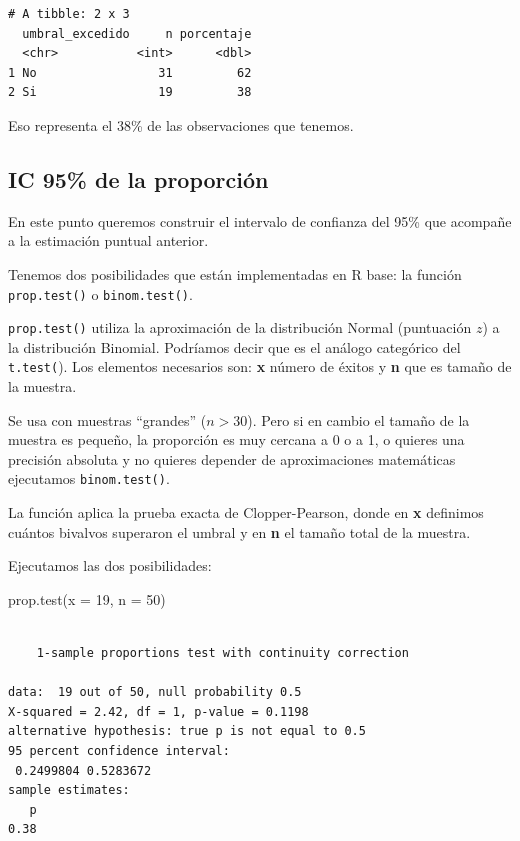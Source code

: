 \documentclass[
  spanish,
  a4paper,
]{scrbook}
\newenvironment{Shaded}{\begin{snugshade}}{\end{snugshade}}
\newcommand{\AttributeTok}[1]{\textcolor[rgb]{0.40,0.45,0.13}{#1}}
\newcommand{\DecValTok}[1]{\textcolor[rgb]{0.68,0.00,0.00}{#1}}
\newcommand{\FunctionTok}[1]{\textcolor[rgb]{0.28,0.35,0.67}{#1}}
\newcommand{\NormalTok}[1]{\textcolor[rgb]{0.00,0.23,0.31}{#1}}
\begin{document}
\begin{verbatim}
# A tibble: 2 x 3
  umbral_excedido     n porcentaje
  <chr>           <int>      <dbl>
1 No                 31         62
2 Si                 19         38
\end{verbatim}

Eso representa el 38\% de las observaciones que tenemos.

\subsection{IC 95\% de la proporción}\label{ic-95-de-la-proporciuxf3n}

En este punto queremos construir el intervalo de confianza del 95\% que
acompañe a la estimación puntual anterior.

Tenemos dos posibilidades que están implementadas en R base: la función
\texttt{prop.test()} o \texttt{binom.test()}.

\texttt{prop.test()} utiliza la aproximación de la distribución Normal
(puntuación \(z\)) a la distribución Binomial. Podríamos decir que es el
análogo categórico del \texttt{t.test(}). Los elementos necesarios son:
\textbf{x} número de éxitos y \textbf{n} que es tamaño de la muestra.

Se usa con muestras ``grandes'' (\(n > 30\)). Pero si en cambio el
tamaño de la muestra es pequeño, la proporción es muy cercana a 0 o a 1,
o quieres una precisión absoluta y no quieres depender de aproximaciones
matemáticas ejecutamos \texttt{binom.test()}.

La función aplica la prueba exacta de Clopper-Pearson, donde en
\textbf{x} definimos cuántos bivalvos superaron el umbral y en
\textbf{n} el tamaño total de la muestra.

Ejecutamos las dos posibilidades:

\begin{Shaded}
\begin{Highlighting}[]
\FunctionTok{prop.test}\NormalTok{(}\AttributeTok{x =} \DecValTok{19}\NormalTok{, }\AttributeTok{n =} \DecValTok{50}\NormalTok{)}
\end{Highlighting}
\end{Shaded}

\begin{verbatim}

    1-sample proportions test with continuity correction

data:  19 out of 50, null probability 0.5
X-squared = 2.42, df = 1, p-value = 0.1198
alternative hypothesis: true p is not equal to 0.5
95 percent confidence interval:
 0.2499804 0.5283672
sample estimates:
   p 
0.38 
\end{verbatim}
\end{document}
